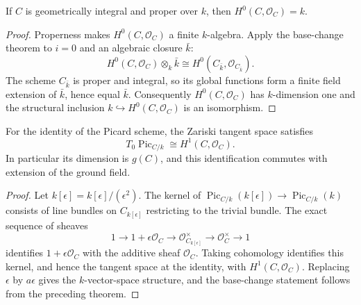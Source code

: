 \begin{proposition}
  \label{mk-prop-global-functions}
  \cite{hartshorne-ag,stacks-schemes}
  If \(C\) is geometrically integral and proper over \(k\), then
  \(H^0(C,\mathcal O_C)=k\).
\end{proposition}

\begin{proof}
  Properness makes \(H^0(C,\mathcal O_C)\) a finite \(k\)-algebra.  Apply the
  base-change theorem to \(i=0\) and an algebraic closure \(\bar k\):
  \[
    H^0(C,\mathcal O_C)\otimes_k\bar k
      \cong H^0(C_{\bar k},\mathcal O_{C_{\bar k}}).
  \]
  The scheme \(C_{\bar k}\) is proper and integral, so its global functions
  form a finite field extension of \(\bar k\), hence equal \(\bar k\).
  Consequently \(H^0(C,\mathcal O_C)\) has \(k\)-dimension one and the
  structural inclusion \(k\hookrightarrow H^0(C,\mathcal O_C)\) is an
  isomorphism.
\end{proof}

\begin{proposition}
  \label{mk-prop-genus-tangent}
  \cite{kleiman-picard}
  For the identity of the Picard scheme, the Zariski tangent space satisfies
  \[
    T_0\operatorname{Pic}_{C/k}\cong H^1(C,\mathcal O_C).
  \]
  In particular its dimension is \(g(C)\), and this identification commutes
  with extension of the ground field.
\end{proposition}

\begin{proof}
  Let \(k[\epsilon]=k[\epsilon]/(\epsilon^2)\).  The kernel of
  \(\operatorname{Pic}_{C/k}(k[\epsilon])\to\operatorname{Pic}_{C/k}(k)\)
  consists of line bundles on \(C_{k[\epsilon]}\) restricting to the trivial
  bundle.  The exact sequence of sheaves
  \[
    1\longrightarrow 1+\epsilon\mathcal O_C
    \longrightarrow\mathcal O_{C_{k[\epsilon]}}^\times
    \longrightarrow\mathcal O_C^\times\longrightarrow1
  \]
  identifies \(1+\epsilon\mathcal O_C\) with the additive sheaf
  \(\mathcal O_C\).  Taking cohomology identifies this kernel, and hence the
  tangent space at the identity, with \(H^1(C,\mathcal O_C)\).  Replacing
  \(\epsilon\) by \(a\epsilon\) gives the \(k\)-vector-space structure, and
  the base-change statement follows from the preceding theorem.
\end{proof}
